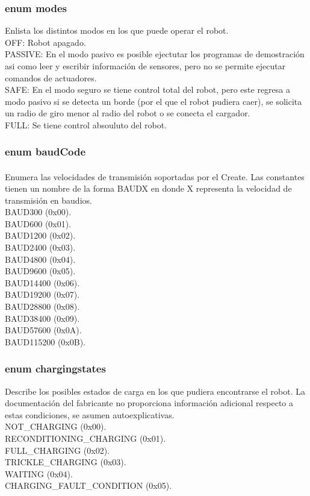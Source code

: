 \documentclass[letterpaper,openright,12pt]{book}
\begin{document}
\subsubsection{enum modes}
Enlista los distintos modos en los que puede operar el robot.\\
OFF: Robot apagado.\\
PASSIVE: En el modo pasivo es posible ejectutar los programas de demostración asi como leer y escribir información de sensores, pero no se permite ejecutar comandos de actuadores.\\
SAFE: En el modo seguro se tiene control total del robot, pero este regresa a modo pasivo si se detecta un borde (por el que el robot pudiera caer), se solicita un radio de giro menor al radio del robot o se conecta el cargador.\\
FULL: Se tiene control absouluto del robot.\\
\subsubsection{enum baudCode}
Enumera las velocidades de transmisión soportadas por el Create\textsuperscript{\textregistered}. Las constantes tienen un nombre de la forma BAUDX en donde X representa la velocidad de transmisión en baudios.\\
BAUD300 (0x00).\\
BAUD600 (0x01).\\
BAUD1200 (0x02).\\
BAUD2400 (0x03).\\
BAUD4800 (0x04).\\
BAUD9600 (0x05).\\
BAUD14400 (0x06).\\
BAUD19200 (0x07).\\
BAUD28800 (0x08).\\
BAUD38400 (0x09).\\
BAUD57600 (0x0A).\\
BAUD115200 (0x0B).\\

\subsubsection{enum  chargingstates}
Describe los posibles estados de carga en los que pudiera encontrarse el robot. La documentación del fabricante no proporciona información adicional respecto a estas condiciones, se asumen autoexplicativas.\\
NOT\_CHARGING (0x00).\\
RECONDITIONING\_CHARGING (0x01).\\
FULL\_CHARGING (0x02).\\
TRICKLE\_CHARGING (0x03).\\
WAITING (0x04).\\
CHARGING\_FAULT\_CONDITION (0x05).\\
\end{document}
